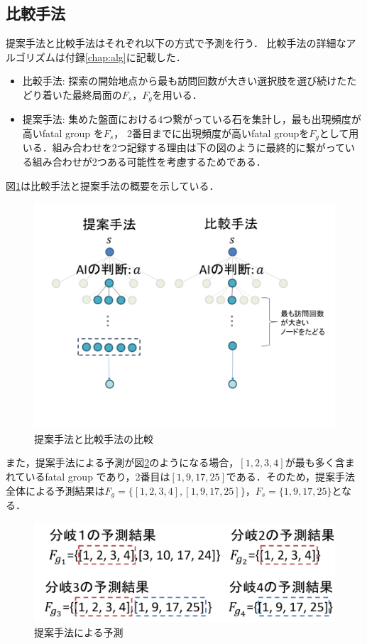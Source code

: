 \subsection{比較手法}
提案手法と比較手法はそれぞれ以下の方式で予測を行う．
比較手法の詳細なアルゴリズムは付録\ref{chap:alg}に記載した．
\newpage
\begin{itemize}
	\item 比較手法: 探索の開始地点から最も訪問回数が大きい選択肢を選び続けたたどり着いた最終局面の$F_s， F_g$を用いる．
	\item 提案手法: 集めた盤面における4つ繋がっている石を集計し，最も出現頻度が高いfatal group を$F_s$， 2番目までに出現頻度が高いfatal groupを$F_g$として用いる．組み合わせを2つ記録する理由は下の図のように最終的に繋がっている組み合わせが2つある可能性を考慮するためである．
\end{itemize}
図\ref{fig:compare}は比較手法と提案手法の概要を示している．
\begin{figure}[htbp]
	\centering
	\includegraphics[width=\linewidth]{./figure/compare-image.png}
	\caption{提案手法と比較手法の比較}
	\label{fig:compare}
\end{figure}
また，提案手法による予測が図\ref{fig:g-example}のようになる場合，$[1,2,3,4]$が最も多く含まれているfatal group
であり，2番目は$[1, 9, 17, 25]$である．そのため，提案手法全体による予測結果は$F_g=\{[1, 2, 3, 4], [1, 9, 17, 25]\}， F_s=\{1, 9, 17, 25\}$となる．
\begin{figure}[htbp]
	\centering
	\includegraphics[width=\linewidth]{./figure/g-example.png}
	\caption{提案手法による予測}
	\label{fig:g-example}
\end{figure}

